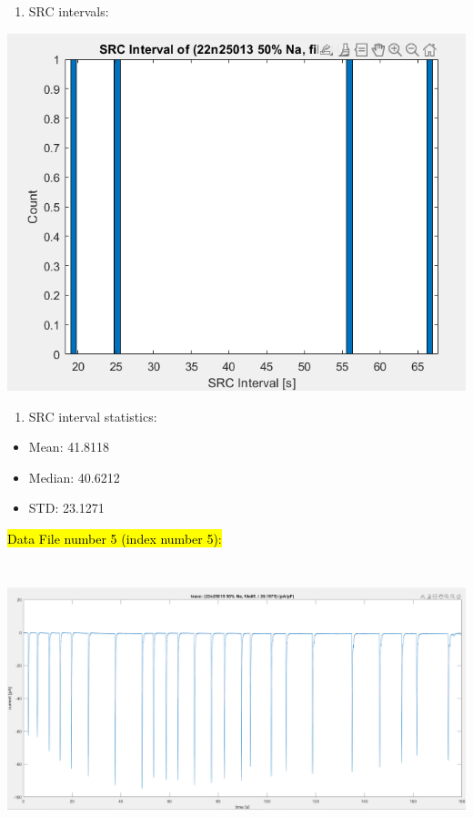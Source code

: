 \begin{enumerate}
\def\labelenumi{\arabic{enumi}.}
\setcounter{enumi}{3}
\item
  SRC intervals:
\end{enumerate}

\includegraphics[width=5.27118in,height=4.08854in]{media/image39.png}

\begin{enumerate}
\def\labelenumi{\arabic{enumi}.}
\setcounter{enumi}{4}
\item
  SRC interval statistics:
\end{enumerate}

\begin{itemize}
\item
  Mean: 41.8118
\item
  Median: 40.6212
\item
  STD: 23.1271
\end{itemize}

\hl{Data File number 5 (index number 5):}

\includegraphics[width=6.5in,height=3.15278in]{media/image8.png}


